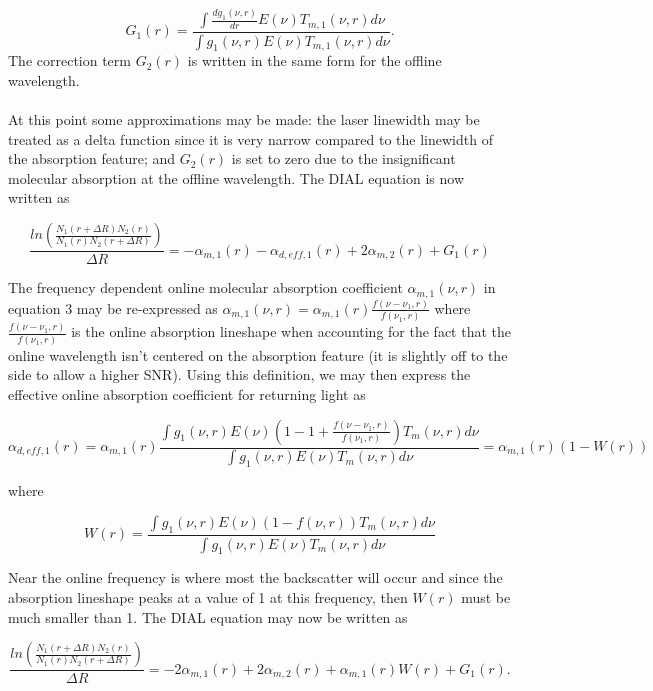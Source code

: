\documentclass[twoside]{article}
\begin{document}
\begin{equation}
	G_1(r) = \frac{\int \frac{dg_1(\nu,r)}{dr} E(\nu) T_{m,1}(\nu,r) d\nu}{\int g_1(\nu,r) E(\nu) T_{m,1}(\nu,r) d\nu}.
\end{equation}
\noindent The correction term $G_2(r)$ is written in the same form for the offline wavelength.\\
\\
At this point some approximations may be made: the laser linewidth may be treated as a delta function since it is very narrow compared to the linewidth of the absorption feature; and $G_2(r)$ is set to zero due to the insignificant molecular absorption at the offline wavelength.
The DIAL equation is now written as

\begin{equation}
	\frac{ln\left(\frac{N_1(r+\Delta R) N_2(r)}{N_1(r) N_2(r+\Delta R)}\right)}{\Delta R} = -\alpha_{m,1}(r) -\alpha_{d,eff,1}(r) +2\alpha_{m,2}(r) + G_1(r)
\end{equation}

\noindent The frequency dependent online molecular absorption coefficient $\alpha_{m,1}(\nu,r)$ in equation 3 may be re-expressed as $\alpha_{m,1}(\nu,r) = \alpha_{m,1}(r) \frac{f(\nu-\nu_1,r)}{f(\nu_1,r)}$ where $\frac{f(\nu-\nu_1,r)}{f(\nu_1,r)}$ is the online absorption lineshape when accounting for the fact that the online wavelength isn't centered on the absorption feature (it is slightly off to the side to allow a higher SNR).
Using this definition, we may then express the effective online absorption coefficient for returning light as

\begin{equation}
	\alpha_{d,eff,1}(r) = \alpha_{m,1}(r) \frac{\int g_1(\nu,r)E(\nu)(1-1+\frac{f(\nu-\nu_1,r)}{f(\nu_1,r)}) T_m(\nu,r) d\nu}{\int g_1(\nu,r) E(\nu) T_m(\nu,r) d\nu} = \alpha_{m,1}(r)(1-W(r))
\end{equation}

\noindent where 

\begin{equation}
	W(r) = \frac{\int g_1(\nu,r) E(\nu) (1- f(\nu,r)) T_m(\nu,r) d\nu}{\int g_1(\nu,r) E(\nu) T_m(\nu,r) d\nu}
\end{equation}

\noindent Near the online frequency is where most the backscatter will occur and since the absorption lineshape peaks at a value of 1 at this frequency, then $W(r)$ must be much smaller than 1.
The DIAL equation may now be written as

\begin{equation}
	\frac{ln\left(\frac{N_1(r+\Delta R) N_2(r)}{N_1(r) N_2(r+\Delta R)}\right)}{\Delta R} = -2\alpha_{m,1}(r) +2\alpha_{m,2}(r) + \alpha_{m,1}(r)W(r) + G_1(r).
\end{equation}
\end{document}
